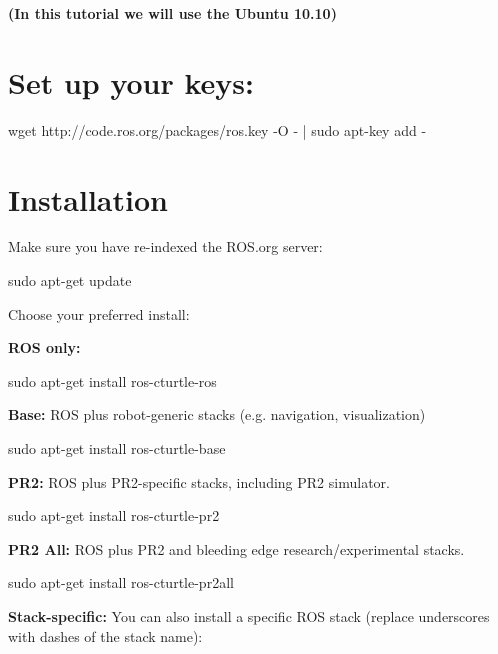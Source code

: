{\bfseries * (In this tutorial we will use the Ubuntu 10.10)}


\section{Set up your keys:}

\hspace{2em}wget http://code.ros.org/packages/ros.key -O - | sudo apt-key add -
\newline

\section{Installation}

Make sure you have re-indexed the ROS.org server:

    \hspace{2em} sudo apt-get update
\newline

Choose your preferred install:

{\hspace{2em}\bfseries ROS only:}

\hspace{4em}
sudo apt-get install ros-cturtle-ros
\newline


{\hspace{2em}\bfseries Base:} ROS plus robot-generic stacks (e.g. navigation, visualization)

\hspace{4em}
sudo apt-get install ros-cturtle-base
\newline


{\hspace{2em}\bfseries PR2:} ROS plus PR2-specific stacks, including PR2 simulator.

\hspace{4em}
sudo apt-get install ros-cturtle-pr2
\newline


{\hspace{2em}\bfseries PR2 All:} ROS plus PR2 and bleeding edge research/experimental stacks.

\hspace{4em}
sudo apt-get install ros-cturtle-pr2all
\newline

{\hspace{2em}\bfseries Stack-specific:} You can also install a specific ROS stack (replace underscores with dashes of the stack name):

